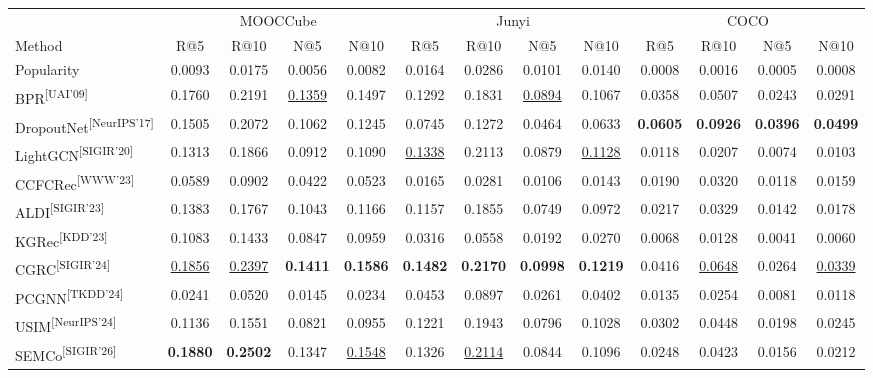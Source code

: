 \documentclass[10pt]{article}
\newcommand{\methodref}[1]{\textsuperscript{\scriptsize[#1]}}
\begin{document}
\begin{table}[!ht]
\centering
{
\small
\setlength{\tabcolsep}{1.35pt}
\renewcommand{\arraystretch}{0.98}
\begin{tabular}{lcccccccccccc}
\toprule
& \multicolumn{4}{c}{MOOCCube} & \multicolumn{4}{c}{Junyi} & \multicolumn{4}{c}{COCO} \\
\cmidrule(lr){2-5}\cmidrule(lr){6-9}\cmidrule(lr){10-13}
Method & R@5 & R@10 & N@5 & N@10 & R@5 & R@10 & N@5 & N@10 & R@5 & R@10 & N@5 & N@10 \\
\midrule
Popularity & 0.0093 & 0.0175 & 0.0056 & 0.0082 & 0.0164 & 0.0286 & 0.0101 & 0.0140 & 0.0008 & 0.0016 & 0.0005 & 0.0008 \\
BPR\methodref{UAI'09} & 0.1760 & 0.2191 & \underline{0.1359} & 0.1497 & 0.1292 & 0.1831 & \underline{0.0894} & 0.1067 & 0.0358 & 0.0507 & 0.0243 & 0.0291 \\
DropoutNet\methodref{NeurIPS'17} & 0.1505 & 0.2072 & 0.1062 & 0.1245 & 0.0745 & 0.1272 & 0.0464 & 0.0633 & \textbf{0.0605} & \textbf{0.0926} & \textbf{0.0396} & \textbf{0.0499} \\
LightGCN\methodref{SIGIR'20} & 0.1313 & 0.1866 & 0.0912 & 0.1090 & \underline{0.1338} & 0.2113 & 0.0879 & \underline{0.1128} & 0.0118 & 0.0207 & 0.0074 & 0.0103 \\
CCFCRec\methodref{WWW'23} & 0.0589 & 0.0902 & 0.0422 & 0.0523 & 0.0165 & 0.0281 & 0.0106 & 0.0143 & 0.0190 & 0.0320 & 0.0118 & 0.0159 \\
ALDI\methodref{SIGIR'23} & 0.1383 & 0.1767 & 0.1043 & 0.1166 & 0.1157 & 0.1855 & 0.0749 & 0.0972 & 0.0217 & 0.0329 & 0.0142 & 0.0178 \\
KGRec\methodref{KDD'23} & 0.1083 & 0.1433 & 0.0847 & 0.0959 & 0.0316 & 0.0558 & 0.0192 & 0.0270 & 0.0068 & 0.0128 & 0.0041 & 0.0060 \\
CGRC\methodref{SIGIR'24} & \underline{0.1856} & \underline{0.2397} & \textbf{0.1411} & \textbf{0.1586} & \textbf{0.1482} & \textbf{0.2170} & \textbf{0.0998} & \textbf{0.1219} & 0.0416 & \underline{0.0648} & 0.0264 & \underline{0.0339} \\
PCGNN\methodref{TKDD'24} & 0.0241 & 0.0520 & 0.0145 & 0.0234 & 0.0453 & 0.0897 & 0.0261 & 0.0402 & 0.0135 & 0.0254 & 0.0081 & 0.0118 \\
USIM\methodref{NeurIPS'24} & 0.1136 & 0.1551 & 0.0821 & 0.0955 & 0.1221 & 0.1943 & 0.0796 & 0.1028 & 0.0302 & 0.0448 & 0.0198 & 0.0245 \\
SEMCo\methodref{SIGIR'26} & \textbf{0.1880} & \textbf{0.2502} & 0.1347 & \underline{0.1548} & 0.1326 & \underline{0.2114} & 0.0844 & 0.1096 & 0.0248 & 0.0423 & 0.0156 & 0.0212 \\

\end{tabular}}
\end{table}
\end{document}
